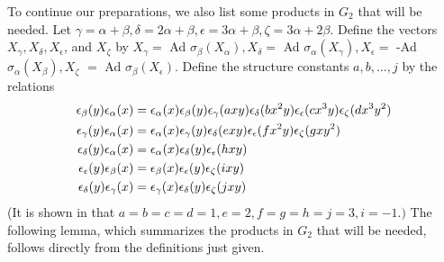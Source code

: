 \documentclass{memo-l}
\theoremstyle{definition}
\theoremstyle{remark}
\numberwithin{section}{chapter}
\numberwithin{equation}{chapter}
\begin{document}
   To continue our preparations, we also list some products in $G_{2}$ that
will be needed.
 Let ${\gamma} = {\alpha}+{\beta}, {\delta} = 2{\alpha}+{\beta},
{\epsilon} = 3{\alpha}+{\beta}, {\zeta} = 3{\alpha}+2{\beta}$.
 Define the vectors $X_{{\gamma}}, X_{{\delta}}, X_{{\epsilon}}$, and
$X_{{\zeta}}$ by $X_{{\gamma}} =$ Ad ${\sigma}_{{\beta}}(X_{{\alpha}}),
X_{{\delta}} =$ Ad ${\sigma}_{{\alpha}}(X_{{\gamma}}), X_{{\epsilon}} =$
-Ad ${\sigma}_{{\alpha}}(X_{{\beta}}), X_{{\zeta}}$
$=$ Ad ${\sigma}_{{\beta}}(X_{{\epsilon}})$.
 Define the structure constants $a,b,\ldots ,j$ by the relations
$$
\aligned
{\epsilon}_{{\beta}}(y){\epsilon}_{{\alpha}}(x) &=
{\epsilon}_{{\alpha}}(x){\epsilon}_{{\beta}}(y){\epsilon}_{{\gamma}}(axy)
{\epsilon}_{{\delta}}(bx^{2}y){\epsilon}_{{\epsilon}}(cx^{3}y)
{\epsilon}_{{\zeta}}(dx^{3}y^{2})\\
{\epsilon}_{{\gamma}}(y){\epsilon}_{{\alpha}}(x) &= {\epsilon}_{{\alpha}}(x)
{\epsilon}_{{\gamma}}(y){\epsilon}_{{\delta}}(exy){\epsilon}_{\epsilon}
(fx^{2}y){\epsilon}_{{\zeta}}(gxy^{2}) \\
{\epsilon}_{{\delta}}(y){\epsilon}_{{\alpha}}(x) &=
{\epsilon}_{{\alpha}}(x){\epsilon}_{{\delta}}(y){\epsilon}_{{\epsilon}}(hxy)\\
{\epsilon}_{{\epsilon}}(y){\epsilon}_{{\beta}}(x) &=
{\epsilon}_{{\beta}}(x){\epsilon}_{{\epsilon}}(y){\epsilon}_{{\zeta}}(ixy)\\
{\epsilon}_{{\delta}}(y){\epsilon}_{{\gamma}}(x) &=
{\epsilon}_{{\gamma}}(x){\epsilon}_{{\delta}}(y){\epsilon}_{{\zeta}}(jxy)
\endaligned
$$
(It is shown in \cite{MR0396773} that $a=b=c=d=1, e=2, f=g=h=j=3, i=-1.)$
The following lemma, which summarizes the products in $G_{2}$ that will be
needed, follows directly from the definitions just given.
\end{document}
